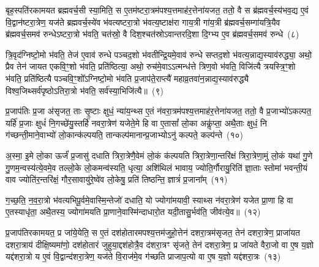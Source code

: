 {\anuvakamend[{तेज॑ उपे॒युः प्र॒त्यक्षं॒ द्विच॑त्वारिꣳशच्च}]}

बृह॒स्पति॑रकामयत ब्रह्मवर्च॒सी स्या॒मिति॒ स ए॒तम॑ष्टरा॒त्रम॑पश्य॒त्तमाह॑र॒त्तेना॑यजत॒ ततो॒ वै स ब्र॑ह्मवर्च॒स्य॑भव॒द्य ए॒वं वि॒द्वान॑ष्टरा॒त्रेण॒ यज॑ते ब्रह्मवर्च॒स्ये॑व भ॑वत्यष्टरा॒त्रो भ॑वत्य॒ष्टाक्ष॑रा गाय॒त्री गा॑य॒त्री ब्र॑ह्मवर्च॒सम्गा॑यत्रि॒यैव ब्र॑ह्मवर्च॒समव॑ रुन्धे\-ऽष्टरा॒त्रो भ॑वति॒ चत॑स्रो॒ वै दिश॒श्चत॑स्रो\-ऽवान्तरदि॒शा दि॒ग्भ्य ए॒व ब्र॑ह्मवर्च॒समव॑ रुन्धे~(८)\ip

त्रि॒वृद॑ग्निष्टो॒मो भ॑वति॒ तेज॑ ए॒वाव॑ रुन्धे पञ्चद॒शो भ॑वतीन्द्रि॒यमे॒वाव॑ रुन्धे सप्तद॒शो भ॑वत्य॒न्नाद्य॒स्याव॑रुद्ध्या॒ अथो॒ प्रैव तेन॑ जायत एकवि॒ꣳ॒शो भ॑वति॒ प्रति॑ष्ठित्या॒ अथो॒ रुच॑मे॒वा\-ऽऽ\-त्मन्ध॑त्ते त्रिण॒वो भ॑वति॒ विजि॑त्यै त्रयस्त्रि॒ꣳ॒शो भ॑वति॒ प्रति॑ष्ठित्यै पञ्चवि॒ꣳ॒शो᳚\-ऽग्निष्टो॒मो भ॑वति प्र॒जा\-प॑ते॒राप्त्यै॑ महाव्र॒तवा॑न॒न्नाद्य॒स्याव॑रुद्ध्यै विश्व॒जिथ्सर्व॑पृष्ठो\-ऽतिरा॒त्रो भ॑वति॒ सर्व॑स्या॒भिजि॑त्यै॥~(९)\ip

{}

प्र॒जा\-प॑तिः प्र॒जा अ॑सृजत॒ ताः सृ॒ष्टाः क्षुधं॒ न्या॑य॒न्थ्स ए॒तं न॑वरा॒त्रम॑पश्य॒त्तमाह॑र॒त्तेना॑यजत॒ ततो॒ वै प्र॒जाभ्यो॑\-ऽकल्पत॒ यर्\mbox{}हि॑ प्र॒जाः क्षुधं॑ नि॒गच्छे॑यु॒स्तर्\mbox{}हि॑ नवरा॒त्रेण॑ यजेते॒मे हि वा ए॒तासां᳚ लो॒का अकॢ॑प्ता॒ अथै॒ताः क्षुधं॒ नि ग॑च्छन्ती॒माने॒वाभ्यो॑ लो॒कान्क॑ल्पयति॒ तान्कल्प॑मानान्प्र॒जाभ्यो\-ऽनु॑ कल्पते॒ कल्प॑न्ते~(१०)\ip

अ॒स्मा॒ इ॒मे लो॒का ऊर्जं॑ प्र॒जासु॑ दधाति त्रिरा॒त्रेणै॒वेमं लो॒कं क॑ल्पयति त्रिरा॒त्रेणा॒न्तरि॑क्षं त्रिरा॒त्रेणा॒मुं लो॒कं यथा॑ गु॒णे गु॒णम॒न्वस्य॑त्ये॒वमे॒व तल्लो॒के लो॒कमन्व॑स्यति॒ धृत्या॒ अशि॑थिलं भावाय॒ ज्योति॒र्गौरायु॒रिति॑ ज्ञा॒ताः स्तोमा॑ भवन्ती॒यं वाव ज्योति॑र॒न्तरि॑क्षं॒ गौर॒सावायु॑रे॒ष्वे॑व लो॒केषु॒ प्रति॑ तिष्ठन्ति॒ ज्ञात्रं॑ प्र॒जाना᳚म्~(११)\ip

ग॒च्छ॒ति॒ न॒व॒रा॒त्रो भ॑वत्यभिपू॒र्वमे॒वास्मि॒न्तेजो॑ दधाति॒ यो ज्योगा॑मयावी॒ स्याथ्स न॑वरा॒त्रेण॑ यजेत प्रा॒णा हि वा ए॒तस्याधृ॑ता॒ अथै॒तस्य॒ ज्योगा॑मयति प्रा॒णाने॒वास्मि॑न्दाधारो॒त यदी॒तासु॒र्भव॑ति॒ जीव॑त्ये॒व॥~(१२)\ip

{\anuvakamend[{कल्प॑न्ते प्र॒जाना॒न्त्रय॑स्त्रिꣳशच्च}]}

प्र॒जा\-प॑तिरकामयत॒ प्र जा॑ये॒येति॒ स ए॒तं दश॑होतारमपश्य॒त्तम॑जुहो॒त्तेन॑ दशरा॒त्रम॑सृजत॒ तेन॑ दशरा॒त्रेण॒ प्राजा॑यत दशरा॒त्राय॑ दीक्षि॒ष्यमा॑णो॒ दश॑होतारं जुहुया॒द्दश॑होत्रै॒व द॑शरा॒त्रꣳ सृ॑जते॒ तेन॑ दशरा॒त्रेण॒ प्र जा॑यते वैरा॒जो वा ए॒ष य॒ज्ञो यद्द॑शरा॒त्रो य ए॒वं वि॒द्वान्द॑शरा॒त्रेण॒ यज॑ते वि॒राज॑मे॒व ग॑च्छति प्राजाप॒त्यो वा ए॒ष य॒ज्ञो यद्द॑शरा॒त्रः~(१३)\ip

